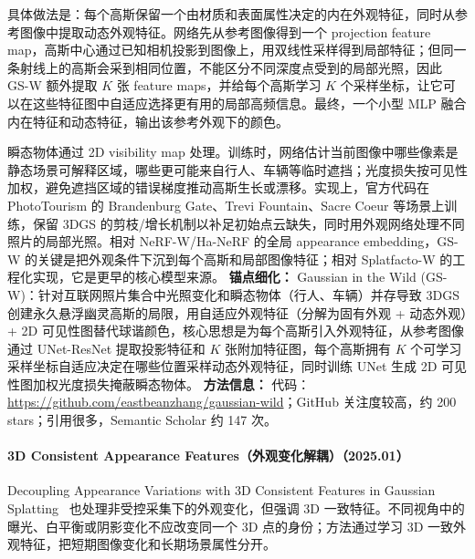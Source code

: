具体做法是：每个高斯保留一个由材质和表面属性决定的内在外观特征，同时从参考图像中提取动态外观特征。网络先从参考图像得到一个 projection feature map，高斯中心通过已知相机投影到图像上，用双线性采样得到局部特征；但同一条射线上的高斯会采到相同位置，不能区分不同深度点受到的局部光照，因此 GS-W 额外提取 $K$ 张 feature maps，并给每个高斯学习 $K$ 个采样坐标，让它可以在这些特征图中自适应选择更有用的局部高频信息。最终，一个小型 MLP 融合内在特征和动态特征，输出该参考外观下的颜色。

瞬态物体通过 2D visibility map 处理。训练时，网络估计当前图像中哪些像素是静态场景可解释区域，哪些更可能来自行人、车辆等临时遮挡；光度损失按可见性加权，避免遮挡区域的错误梯度推动高斯生长或漂移。实现上，官方代码在 PhotoTourism 的 Brandenburg Gate、Trevi Fountain、Sacre Coeur 等场景上训练，保留 3DGS 的剪枝/增长机制以补足初始点云缺失，同时用外观网络处理不同照片的局部光照。相对 NeRF-W/Ha-NeRF 的全局 appearance embedding，GS-W 的关键是把外观条件下沉到每个高斯和局部图像特征；相对 Splatfacto-W 的工程化实现，它是更早的核心模型来源。
\textbf{锚点细化：} Gaussian in the Wild (GS-W)：针对互联网照片集合中光照变化和瞬态物体（行人、车辆）并存导致 3DGS 创建永久悬浮幽灵高斯的局限，用自适应外观特征（分解为固有外观 + 动态外观）+ 2D 可见性图替代球谐颜色，核心思想是为每个高斯引入外观特征，从参考图像通过 UNet-ResNet 提取投影特征和 $K$ 张附加特征图，每个高斯拥有 $K$ 个可学习采样坐标自适应决定在哪些位置采样动态外观特征，同时训练 UNet 生成 2D 可见性图加权光度损失掩蔽瞬态物体。
\textbf{方法信息：} 代码：\url{https://github.com/eastbeanzhang/gaussian-wild}；GitHub 关注度较高，约 200 stars；引用很多，Semantic Scholar 约 147 次。



\paragraph{3D Consistent Appearance Features（外观变化解耦）（2025.01）}
Decoupling Appearance Variations with 3D Consistent Features in Gaussian Splatting~\cite{2501_10788} 也处理非受控采集下的外观变化，但强调 3D 一致特征。不同视角中的曝光、白平衡或阴影变化不应改变同一个 3D 点的身份；方法通过学习 3D 一致外观特征，把短期图像变化和长期场景属性分开。

